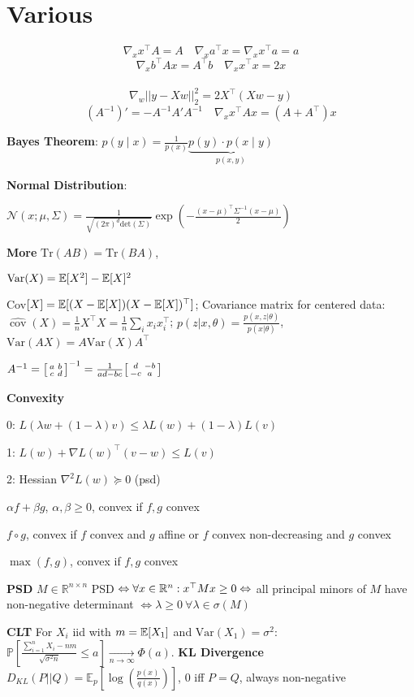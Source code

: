 \section*{Various}

$$\nabla_x x^\top A = A \quad \nabla_x a^\top x = \nabla_x x^\top a = a$$
$$\nabla_x b^\top A x = A^\top b \quad \nabla_x x^\top x = 2x$$\\[-20pt]
$$\nabla_w || y-Xw||_2^2 = 2X^\top(Xw-y)$$
$$(A^{-1})' = -A^{-1} A' A^{-1} \quad \nabla_x x^\top A x = (A + A^\top)x$$

\textbf{Bayes Theorem}: $p(y \; | \; x) = \frac{1}{p(x)} \underbrace{p(y) \cdot p(x \; | \; y)}_{p(x,y)}$

\textbf{Normal Distribution}:

$\mathcal{N}(x; \mu, \Sigma) = \frac{1}{\sqrt{(2 \pi)^d \text{det}(\Sigma)}} \exp(-\frac{(x - \mu)^\top \Sigma^{-1} (x-\mu)}{2})$

\textbf{More} $\text{Tr}(AB) = \text{Tr}(BA)$, 

$\text{Var}(X) = \mathbb{E}[X^2] - \mathbb{E}[X]^2$
 
Cov$[X] = \mathbb{E}[(X- \mathbb{E}[X])(X- \mathbb{E}[X])^\top]$;
Covariance matrix for centered data: $
\widehat{\operatorname{cov}}(X)=\frac{1}{n}X^\top X=\frac{1}{n}\sum_i x_ix_i^\top
$; $p(z|x,\theta) = \frac{p(x,z|\theta)}{p(x | \theta)}$, $\text{Var}(AX) = A \text{Var}(X) A^\top$

$A^{-1}=
\begin{bsmallmatrix}
a&b \\ 
c&d
\end{bsmallmatrix}^{-1}=\frac{1}{ad-bc}
\begin{bsmallmatrix}
d&-b \\ 
-c&a
\end{bsmallmatrix}
$

\textbf{Convexity}

0: $L(\lambda w + (1 - \lambda)v) \leq \lambda L (w) + (1- \lambda) L(v)$

1: $L(w) + \nabla L(w)^\top (v - w) \leq L(v)$

2: Hessian $\nabla^2 L (w) \succcurlyeq 0$ (psd)

\begin{rowlist}
	\item $\alpha f + \beta g$, $\alpha, \beta \geq 0$, convex if $f, g$ convex
	\item $f \circ g$, convex if $f$ convex and $g$ affine or $f$ convex non-decreasing and $g$ convex
	\item $\max(f, g)$, convex if $f,g$ convex
\end{rowlist}

\textbf{PSD}
$M \in \mathbb{R}^{n\times n}$ PSD $\Leftrightarrow \forall x \in \mathbb{R}^n: x^\top Mx \geq 0 \\
\Leftrightarrow$ all principal minors of $M$ have non-negative determinant $\Leftrightarrow \lambda \geq 0 \ \forall \lambda\in\sigma(M)$

\textbf{CLT} For $X_i$ iid with $m = \mathbb{E}[X_1]$ and $\text{Var}(X_1) = \sigma^2$: $\mathbb{P}\left[\frac{\sum_{i=1}^n X_i - n m}{\sqrt{\sigma^2 n}} \leq a\right] \xrightarrow[n \to \infty]{} \Phi(a)$.
\textbf{KL Divergence} $D_{KL}(P||Q) = \mathbb{E}_p[\log(\frac{p(x)}{q(x)})]$, 0 iff $P = Q$, always non-negative
